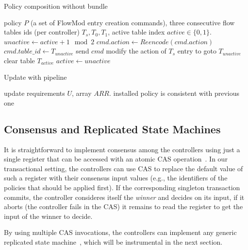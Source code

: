 \documentclass[conference]{sigcomm-alternate}
\begin{document}
\begin{algorithm}[t]
    \caption{Policy composition without bundle}
    \label{alg:wobundle}
    \begin{algorithmic}[1]
    \Require policy $P$ (a set of FlowMod entry creation commands), three consecutive flow tables ids (per controller) $T_s,T_0,T_1$, active table index $active\in\{0,1\}$.
    \State $unactive \gets active + 1 \mod{2}$
	    \State $cmd.action\gets Reencode(cmd.action)$
	    \State $cmd.table\_id\gets T_{unactive}$
	    \State send $cmd$
    \EndFor
    \State modify the action of $T_s$ entry to goto $T_{unactive}$
    \State clear table $T_{active}$
    \State $active \gets unactive$
	\Return

    \end{algorithmic}
\end{algorithm}

\begin{algorithm}[t]
    \caption{Update with pipeline}
    \label{alg:pipeline}
    \begin{algorithmic}[1]
    \Require update requirements $U$, array $ARR$.
    \Ensure installed policy is consistent with previous one
			\Return

    \end{algorithmic}
\end{algorithm}

\subsection{Consensus and Replicated State Machines}

It is straightforward to implement consensus among the controllers
using just a single register that can be accessed with an atomic CAS
operation~\cite{Her91}. In our transactional setting, the controllers
can use CAS to replace the default value of such a register 
with their consensus input values (e.g., the identifiers of the
policies that should be applied first). If the corresponding
singleton transaction commits, the controller consideres itself 
the \emph{winner} and decides on its input, if
it aborts (the controller fails in the CAS) it remains to read the register to get the input of the
winner to decide.    

By using multiple CAS invocations, the controllers can implement any
generic replicated state machine~\cite{Her91,Lam98}, which will be instrumental in the
next section. 
\end{document}
